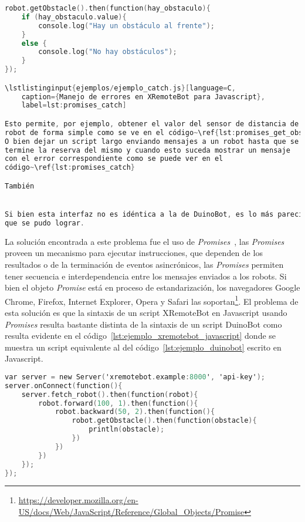 \begin{lstlisting}[language=C,
caption={Implementación de \texttt{getObstacle()} con ``promesas''},
label=lst:promises_get_obstacle]
robot.getObstacle().then(function(hay_obstaculo){
    if (hay_obstaculo.value){
        console.log("Hay un obstáculo al frente");
    }
    else {
        console.log("No hay obstáculos");
    }
});

\lstlistinginput{ejemplos/ejemplo_catch.js}[language=C,
    caption={Manejo de errores en XRemoteBot para Javascript},
    label=lst:promises_catch]

Esto permite, por ejemplo, obtener el valor del sensor de distancia de un
robot de forma simple como se ve en el código~\ref{lst:promises_get_obstacle}.
O bien dejar un script largo enviando mensajes a un robot hasta que se
termine la reserva del mismo y cuando esto suceda mostrar un mensaje
con el error correspondiente como se puede ver en el
código~\ref{lst:promises_catch}

También


Si bien esta interfaz no es idéntica a la de DuinoBot, es lo más parecido
que se pudo lograr.

\end{lstlisting}
La solución encontrada a este problema fue el uso de
\textit{Promises}~\citep{ECMA-262},
las \textit{Promises} proveen un mecanismo para ejecutar instrucciones,
que dependen de los resultados o de la terminación de eventos asincrónicos,
las \textit{Promises} permiten tener secuencia e interdependencia entre los
mensajes enviados a los
robots.
Si bien el objeto \textit{Promise} está en proceso de estandarización,
los navegadores Google Chrome, Firefox, Internet Explorer, Opera y Safari las
soportan\footnote{\url{https://developer.mozilla.org/en-US/docs/Web/JavaScript/Reference/Global_Objects/Promise}}.
El problema de esta solución es que la sintaxis de un script XRemoteBot en
Javascript usando \textit{Promises}
resulta bastante distinta de la sintaxis de un script DuinoBot como resulta
evidente
en el código~\ref{lst:ejemplo_xremotebot_javascript} donde se muestra un
script equivalente
al del código~\ref{lst:ejemplo_duinobot} escrito en Javascript.

\begin{lstlisting}[language=C,
caption={Ejemplo de XRemoteBot en Javascript},
label=lst:ejemplo_xremotebot_javascript]
var server = new Server('xremotebot.example:8000', 'api-key');
server.onConnect(function(){
    server.fetch_robot().then(function(robot){
        robot.forward(100, 1).then(function(){
            robot.backward(50, 2).then(function(){
                robot.getObstacle().then(function(obstacle){
                    println(obstacle);
                })
            })
        })
    });
});
\end{lstlisting}


